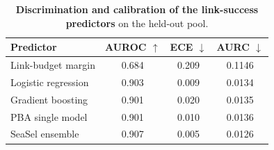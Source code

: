 \begin{table}[t]\centering\small
\caption{\textbf{Discrimination and calibration of the link-success predictors} on the held-out pool.}
\label{tab:disc}
\begin{tabular}{@{}lccc@{}}\toprule
Predictor & AUROC $\uparrow$ & ECE $\downarrow$ & AURC $\downarrow$\\\midrule
Link-budget margin & 0.684 & 0.209 & 0.1146\\
Logistic regression & 0.903 & 0.009 & 0.0134\\
Gradient boosting & 0.901 & 0.020 & 0.0135\\
PBA single model & 0.901 & 0.010 & 0.0136\\
SeaSel ensemble & 0.907 & 0.005 & 0.0126\\
\bottomrule\end{tabular}\end{table}